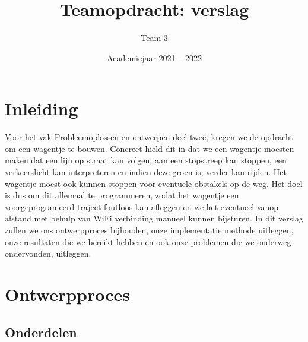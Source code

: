 \documentclass[kulak]{kulakarticle} %
\title{Teamopdracht: verslag}
\author{Team 3}
\date{Academiejaar 2021 -- 2022}
\begin{document}
\maketitle

\section*{Inleiding}
Voor het vak Probleemoplossen en ontwerpen deel twee, kregen we de opdracht om een wagentje te bouwen. Concreet hield dit in dat we een wagentje moesten maken dat een lijn op straat kan volgen, aan een stopstreep kan stoppen, een verkeerslicht kan interpreteren en indien deze groen is, verder kan rijden. Het wagentje moest ook kunnen stoppen voor eventuele obstakels op de weg. Het doel is dus om dit allemaal te programmeren, zodat het wagentje een voorgeprogrameerd traject foutloos kan afleggen en we het eventueel vanop afstand met behulp van WiFi verbinding manueel kunnen bijsturen.
In dit verslag zullen we ons ontwerpproces bijhouden, onze implementatie methode uitleggen, onze resultaten die we bereikt hebben en ook onze problemen die we onderweg ondervonden, uitleggen. 




\section{Ontwerpproces}
\subsection{Onderdelen}
\end{document}
